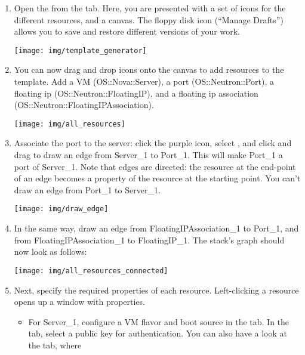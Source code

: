 \begin{enumerate}
\item Open the  from the
   tab.  Here, you are presented with a set of
  icons for the different resources, and a canvas.  The floppy disk
  icon (``Manage Drafts'') allows you to save and restore different
  versions of your work.
  \begin{center}
    \texttt{[image: img/template\_generator]}
  \end{center}
\item You can now drag and drop icons onto the canvas to add resources
  to the template.  Add a VM (OS::Nova::Server), a port
  (OS::Neutron::Port), a floating ip (OS::Neutron::FloatingIP), and a
  floating ip association (OS::Neutron::FloatingIPAssociation).
  \begin{center}
    \texttt{[image: img/all\_resources]}
  \end{center}
\item Associate the port to the server: click the purple
   icon, select , and
  click and drag to draw an edge from Server\_1 to Port\_1.  This will
  make Port\_1 a port of Server\_1.  Note that edges are directed: the
  resource at the end-point of an edge becomes a property of the
  resource at the starting point.  You can't draw an edge from Port\_1
  to Server\_1.
  \begin{center}
    \texttt{[image: img/draw\_edge]}
  \end{center}
\item In the same way, draw an edge from FloatingIPAssociation\_1 to
  Port\_1, and from FloatingIPAssociation\_1 to FloatingIP\_1.  The
  stack's graph should now look as follows:
  \begin{center}
    \texttt{[image: img/all\_resources\_connected]}
  \end{center}
\item Next, specify the required properties of each resource.
  Left-clicking a resource opens up a window with properties.
  \begin{itemize}
  \item For Server\_1, configure a VM flavor and boot source in the
     tab.  In the  tab, select a public key for authentication.  You
    can also have a look at the  tab, where

\end{itemize}
\end{enumerate}

